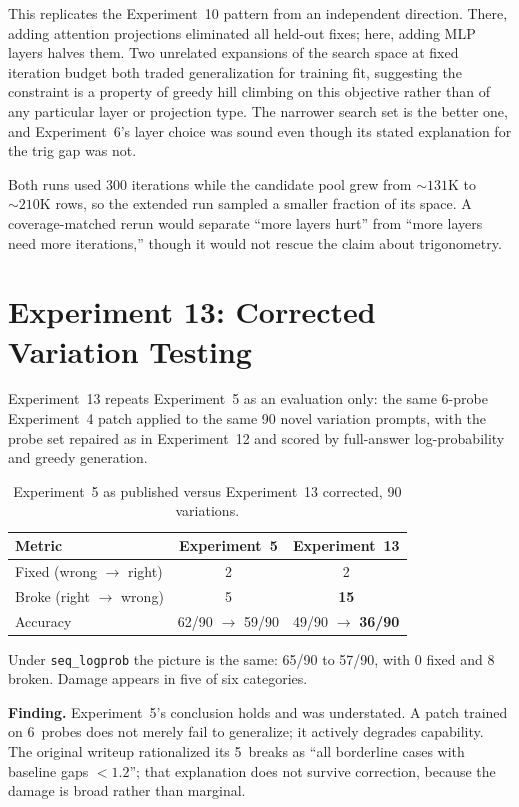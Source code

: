 \documentclass[11pt,a4paper]{article}
\begin{document}
This replicates the Experiment~10 pattern from an independent direction. There,
adding attention projections eliminated all held-out fixes; here, adding MLP
layers halves them. Two unrelated expansions of the search space at fixed
iteration budget both traded generalization for training fit, suggesting the
constraint is a property of greedy hill climbing on this objective rather than of
any particular layer or projection type. The narrower search set is the better
one, and Experiment~6's layer choice was sound even though its stated explanation
for the trig gap was not.

Both runs used 300 iterations while the candidate pool grew from ${\sim}131$K to
${\sim}210$K rows, so the extended run sampled a smaller fraction of its space. A
coverage-matched rerun would separate ``more layers hurt'' from ``more layers need
more iterations,'' though it would not rescue the claim about trigonometry.

\section{Experiment 13: Corrected Variation Testing}
\label{sec:exp13}

Experiment~13 repeats Experiment~5 as an evaluation only: the same 6-probe
Experiment~4 patch applied to the same 90 novel variation prompts, with the probe
set repaired as in Experiment~12 and scored by full-answer log-probability and
greedy generation.

\begin{table}[h]
\centering
\caption{Experiment~5 as published versus Experiment~13 corrected, 90 variations.}
\begin{tabular}{lcc}
\toprule
Metric & Experiment~5 & Experiment~13 \\
\midrule
Fixed (wrong $\to$ right) & 2 & 2 \\
Broke (right $\to$ wrong) & 5 & \textbf{15} \\
Accuracy & 62/90 $\to$ 59/90 & 49/90 $\to$ \textbf{36/90} \\
\bottomrule
\end{tabular}
\end{table}

Under \texttt{seq\_logprob} the picture is the same: 65/90 to 57/90, with 0 fixed
and 8 broken. Damage appears in five of six categories.

\textbf{Finding.} Experiment~5's conclusion holds and was understated. A patch
trained on 6~probes does not merely fail to generalize; it actively degrades
capability. The original writeup rationalized its 5~breaks as ``all borderline
cases with baseline gaps $< 1.2$''; that explanation does not survive correction,
because the damage is broad rather than marginal.
\end{document}

